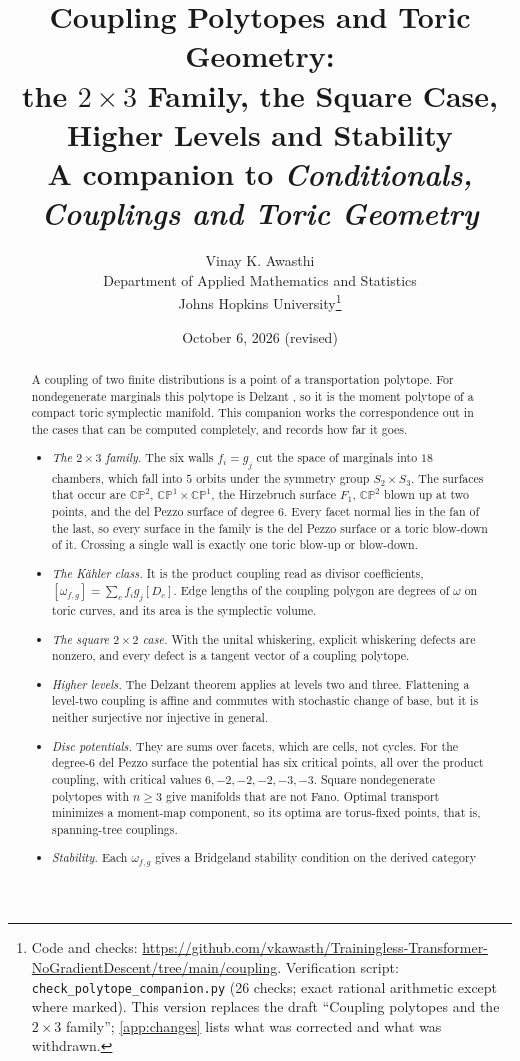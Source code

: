 \documentclass[11pt]{article}
\title{Coupling Polytopes and Toric Geometry:\\
the $2\times3$ Family, the Square Case, Higher Levels and Stability\\[4pt]
\large A companion to \emph{Conditionals, Couplings and Toric Geometry}}
\author{Vinay K. Awasthi\\
Department of Applied Mathematics and Statistics\\
Johns Hopkins University\thanks{Code and checks: \url{https://github.com/vkawasth/Trainingless-Transformer-NoGradientDescent/tree/main/coupling}. Verification script: \texttt{check\_polytope\_companion.py}
(26 checks; exact rational arithmetic except where marked). This version replaces the draft
``Coupling polytopes and the $2\times3$ family''; \cref{app:changes} lists what was corrected and
what was withdrawn.}}
\date{October 6, 2026 (revised)}
\theoremstyle{definition}
\theoremstyle{remark}
\newcommand{\CP}{\mathbb{CP}}
\begin{document}
\maketitle

\begin{abstract}
A coupling of two finite distributions is a point of a transportation polytope. For nondegenerate
marginals this polytope is Delzant \cite{Conditionals}, so it is the moment polytope of a compact
toric symplectic manifold. This companion works the correspondence out in the cases that can be
computed completely, and records how far it goes.
\begin{itemize}[leftmargin=*]
\item \emph{The $2\times3$ family.} The six walls $f_i=g_j$ cut the space of marginals into $18$
  chambers, which fall into $5$ orbits under the symmetry group $S_2\times S_3$. The surfaces that occur
  are $\CP^2$, $\CP^1\times\CP^1$, the Hirzebruch surface $F_1$, $\CP^2$ blown up at two points, and
  the del Pezzo surface of degree $6$. Every facet normal lies in the fan of the last, so every surface
  in the family is the del Pezzo surface or a toric blow-down of it. Crossing a single wall is exactly
  one toric blow-up or blow-down.
\item \emph{The Kähler class.} It is the product coupling read as divisor coefficients,
  $[\omega_{f,g}]=\sum_cf_ig_j[D_c]$. Edge lengths of the coupling polygon are degrees of $\omega$ on
  toric curves, and its area is the symplectic volume.
\item \emph{The square $2\times2$ case.} With the unital whiskering, explicit whiskering defects are
  nonzero, and every defect is a tangent vector of a coupling polytope.
\item \emph{Higher levels.} The Delzant theorem applies at levels two and three. Flattening a level-two
  coupling is affine and commutes with stochastic change of base, but it is neither surjective nor
  injective in general.
\item \emph{Disc potentials.} They are sums over facets, which are cells, not cycles. For the degree-6
  del Pezzo surface the potential has six critical points, all over the product coupling, with critical
  values $6,-2,-2,-2,-3,-3$. Square nondegenerate polytopes with $n\ge3$ give manifolds that are not
  Fano. Optimal transport minimizes a moment-map component, so its optima are torus-fixed points,
  that is, spanning-tree couplings.
\item \emph{Stability.} Each $\omega_{f,g}$ gives a Bridgeland stability condition on the derived category

\end{itemize}
\end{abstract}
\end{document}
